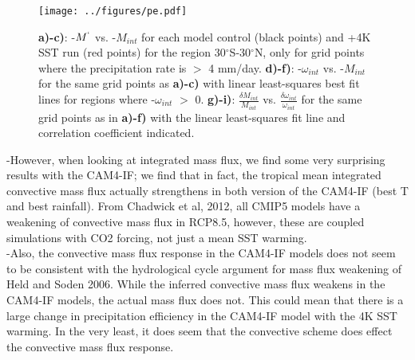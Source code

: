 \documentclass[letterpaper,12pt,titlepage,oneside,final]{book}
\begin{document}
\begin{figure}[H]
\centering
\noindent\texttt{[image: ../figures/pe.pdf]}\hfill
\caption{\textbf{a)-c)}: -$M^{`}$ vs. -$M_{int}$ for each model control (black points) and +4K SST run (red points) for the region 30$^\circ$S-30$^\circ$N, only for grid points where the precipitation rate is $>$ 4 mm/day. \textbf{d)-f)}: -$\omega_{int}$ vs. -$M_{int}$ for the same grid points as \textbf{a)-c)} with linear least-squares best fit lines for regions where -$\omega_{int}$ $>$ 0. \textbf{g)-i)}: $\frac{\delta{M_{int}}}{M_{int}}$ vs. $\frac{\delta{\omega_{int}}}{\omega_{int}}$ for the same grid points as in \textbf{a)-f)} with the linear least-squares fit line and correlation coefficient indicated. }
\end{figure}

-However, when looking at integrated mass flux, we find some very surprising results with the CAM4-IF; we find that in fact, the tropical mean integrated convective mass flux actually strengthens in both version of the CAM4-IF (best T and best rainfall). From Chadwick et al, 2012, all CMIP5 models have a weakening of convective mass flux in RCP8.5, however, these are coupled simulations with CO2 forcing, not just a mean SST warming. 
\\
-Also, the convective mass flux response in the CAM4-IF models does not seem to be consistent with the hydrological cycle argument for mass flux weakening of Held and Soden 2006. While the inferred convective mass flux weakens in the CAM4-IF models, the actual mass flux does not. This could mean that there is a large change in precipitation efficiency in the CAM4-IF model with the 4K SST warming. In the very least, it does seem that the convective scheme does effect the convective mass flux response.
\\
\end{document}
